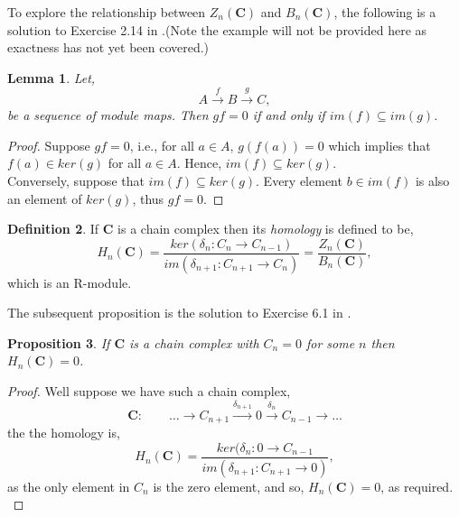 \documentclass[11.5pt, twoside, a4paper, titlepage]{report}
\theoremstyle{definition}
\newtheorem{mydef}{Definition}[section]
\theoremstyle{plain}
\newtheorem{lem}[mydef]{Lemma}
\newtheorem{prop}[mydef]{Proposition}
\begin{document}
To explore the relationship between $Z_n(\mathbf{C})$ and $B_n(\mathbf{C})$, the following is a solution to Exercise 2.14 in \cite{Rotman}.(Note the example will not be provided here as exactness has not yet been covered.)

\begin{lem}\label{iminkerlem}
Let,
\begin{equation*}
A \xrightarrow{f} B \xrightarrow{g} C,
\end{equation*}
be a sequence of module maps. Then $gf=0$ if and only if $im(f)\subseteq im(g)$.
\end{lem}
\begin{proof}
Suppose $gf=0$, i.e., for all $a\in A$, $g(f(a))=0$ which implies that $f(a)\in ker(g)$ for all $a \in A$. Hence, $im(f) \subseteq ker(g)$.\\
Conversely, suppose that $im(f) \subseteq ker(g)$. Every element $b\in im(f)$ is also an element of $ker(g)$, thus $gf=0$.
\end{proof}

\begin{mydef} \label{homologydefn}
If $\mathbf{C}$ is a chain complex then its \emph{homology} is defined to be,
\begin{equation*}
H_n(\mathbf{C})=\frac{ker(\delta_n:C_n \rightarrow C_{n-1})}{im(\delta_{n+1}:C_{n+1} \rightarrow C_n)}=\frac{Z_n(\mathbf{C})}{B_n(\mathbf{C})},
\end{equation*}
which is an R-module.
\end{mydef}


The subsequent proposition is the solution to Exercise 6.1 in \cite{Rotman}.

\begin{prop}
If $\mathbf{C}$ is a chain complex with $C_n=0$ for some $n$ then $H_n(\mathbf{C})=0$.
\end{prop}
\begin{proof}
Well suppose we have such a chain complex, 
\begin{equation*}
\mathbf{C}: \qquad \dots \xrightarrow{} C_{n+1} \xrightarrow{\delta_{n+1}} 0 \xrightarrow{\delta_n} C_{n-1} \xrightarrow{} \dots
\end{equation*}
the the homology is,
\begin{equation*}
H_n(\mathbf{C})=\frac{ker(\delta_n: 0 \to C_{n-1}}{im(\delta_{n+1}: C_{n+1}\to 0)},
\end{equation*}
as the only element in $C_n$ is the zero element, and so, $H_n(\mathbf{C})=0$, as required.\\
\end{proof}
\end{document}
